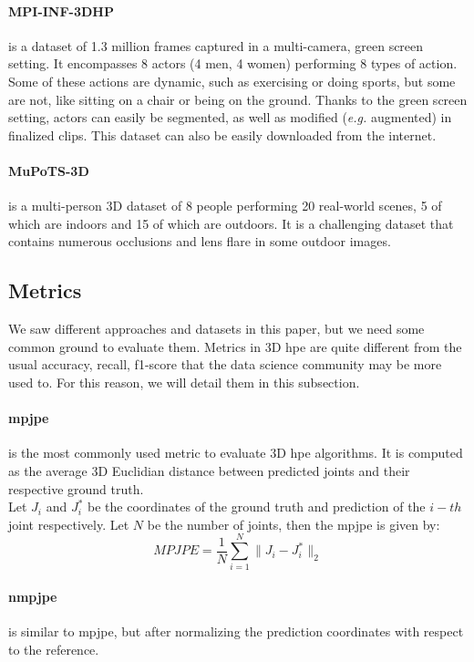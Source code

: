 \documentclass[runningheads]{llncs}
\begin{document}
\paragraph{MPI-INF-3DHP} \cite{MPI-INF-3DHP} is a dataset of 1.3 million frames captured in a multi-camera, green screen setting. It encompasses 8 actors (4 men, 4 women) performing 8 types of action. Some of these actions are dynamic, such as exercising or doing sports, but some are not, like sitting on a chair or being on the ground. Thanks to the green screen setting, actors can easily be segmented, as well as modified (\textit{e.g.} augmented) in finalized clips. This dataset can also be easily downloaded from the internet.
\paragraph{MuPoTS-3D} \cite{MuPoTS-3D} is a multi-person 3D dataset of 8 people performing 20 real-world scenes, 5 of which are indoors and 15 of which are outdoors. It is a challenging dataset that contains numerous occlusions and lens flare in some outdoor images.

\subsection{Metrics}
We saw different approaches and datasets in this paper, but we need some common ground to evaluate them. Metrics in 3D \ac{hpe} are quite different from the usual accuracy, recall, f1-score that the data science community may be more used to. For this reason, we will detail them in this subsection.
\paragraph{\ac{mpjpe}} is the most commonly used metric to evaluate 3D \ac{hpe} algorithms. It is computed as the average 3D Euclidian distance between predicted joints and their respective ground truth. \\
Let $J_i$ and $J_i^*$ be the coordinates of the ground truth and prediction of the $i-th$ joint respectively. Let $N$ be the number of joints, then the \ac{mpjpe} is given by:
\begin{equation}
  MPJPE = \frac{1}{N} \sum_{i=1}^N \|J_i - J_i^*\|_2
\end{equation}

\paragraph{\ac{nmpjpe}} is similar to \ac{mpjpe}, but after normalizing the prediction coordinates with respect to the reference.
\end{document}
